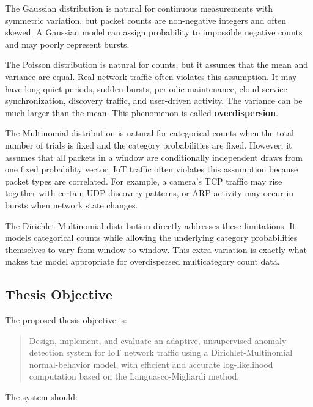 \documentclass[11pt,a4paper]{article}
\begin{document}
The Gaussian distribution is natural for continuous measurements with symmetric variation, but packet counts are non-negative integers and often skewed. A Gaussian model can assign probability to impossible negative counts and may poorly represent bursts.

The Poisson distribution is natural for counts, but it assumes that the mean and variance are equal. Real network traffic often violates this assumption. It may have long quiet periods, sudden bursts, periodic maintenance, cloud-service synchronization, discovery traffic, and user-driven activity. The variance can be much larger than the mean. This phenomenon is called \textbf{overdispersion}.

The Multinomial distribution is natural for categorical counts when the total number of trials is fixed and the category probabilities are fixed. However, it assumes that all packets in a window are conditionally independent draws from one fixed probability vector. IoT traffic often violates this assumption because packet types are correlated. For example, a camera's TCP traffic may rise together with certain UDP discovery patterns, or ARP activity may occur in bursts when network state changes.

The Dirichlet-Multinomial distribution directly addresses these limitations. It models categorical counts while allowing the underlying category probabilities themselves to vary from window to window. This extra variation is exactly what makes the model appropriate for overdispersed multicategory count data.

\subsection{Thesis Objective}

The proposed thesis objective is:

\begin{quote}
Design, implement, and evaluate an adaptive, unsupervised anomaly detection system for IoT network traffic using a Dirichlet-Multinomial normal-behavior model, with efficient and accurate log-likelihood computation based on the Languasco-Migliardi method.
\end{quote}

The system should:
\end{document}
